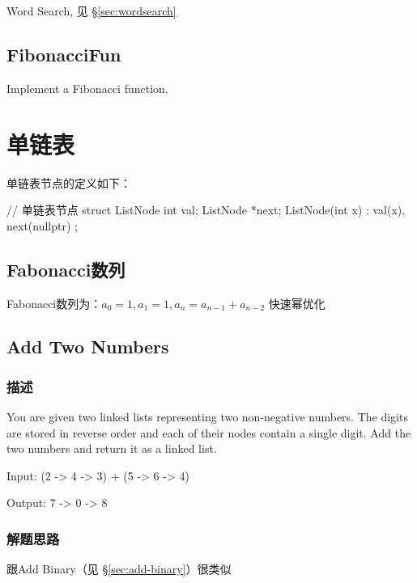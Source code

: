 \begindot
\item Word Search, 见 \S \ref{sec:wordsearch}
\myenddot

\subsection{FibonacciFun}
Implement a Fibonacci function.

\section{单链表} %

单链表节点的定义如下：
\begin{Code}
	// 单链表节点
	struct ListNode {
		int val;
		ListNode *next;
		ListNode(int x) : val(x), next(nullptr) { }
	};
\end{Code}

\subsection{Fabonacci数列}
Fabonacci数列为：$a_0=1,a_1=1,a_n=a_{n-1}+a_{n-2}$
快速幂优化

\subsection{Add Two Numbers}
\label{sec:add-two-numbers}


\subsubsection{描述}
You are given two linked lists representing two non-negative numbers. The 
digits are stored in reverse order and each of their nodes contain a single 
digit. Add the two numbers and return it as a linked list.

Input: {\small {} (2 -> 4 -> 3) + (5 -> 6 -> 4)}

Output: {\small {} 7 -> 0 -> 8}


\subsubsection{解题思路}
跟Add Binary（见 \S \ref{sec:add-binary}）很类似


